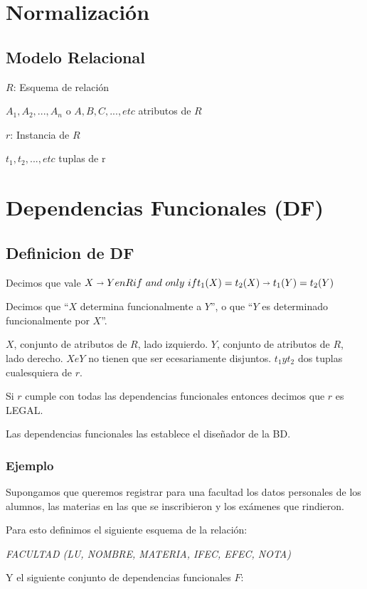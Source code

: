 \documentclass[10pt, a4paper,english,spanish]{article}
\newcommand{\imp}{\shortrightarrow}
\begin{document}
\section{Normalizaci\'on}

\subsection{Modelo Relacional}

$R$: Esquema de relaci\'on

$A_{1}, A_{2}, ..., A_n$ o $A, B, C, ..., etc$ atributos de $R$

$r$: Instancia de $R$

$t_1, t_2, ..., etc$ tuplas de r

\section{Dependencias Funcionales (DF)}
\subsection{Definicion de DF}

Decimos que vale $X \imp Y en R \iff t_1(X)=t_2(X) \imp t_1(Y)=t_2(Y)$

Decimos que ``$X$ determina funcionalmente a $Y$'', o que ``$Y$ es determinado funcionalmente por $X$''.

$X$, conjunto de atributos de $R$, lado izquierdo.
$Y$, conjunto de atributos de $R$, lado derecho.
$X e Y$ no tienen que ser ecesariamente disjuntos.
$t_1 y t_2$ dos tuplas cualesquiera de $r$.

Si $r$ cumple con todas las dependencias funcionales entonces decimos que $r$ es LEGAL.

Las dependencias funcionales las establece el dise\~nador de la BD.

\subsubsection{Ejemplo}
Supongamos que queremos registrar para una facultad los datos personales de los alumnos, las materias en las que se inscribieron y los ex\'amenes que rindieron.

Para esto definimos el siguiente esquema de la relaci\'on:

\textit{FACULTAD (LU, NOMBRE, MATERIA, IFEC, EFEC, NOTA)}

Y el siguiente conjunto de dependencias funcionales $F$:
\end{document}
